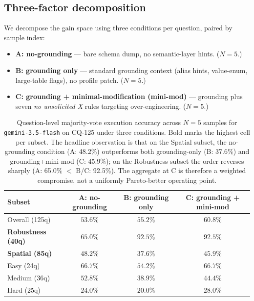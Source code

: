 \subsection{Three-factor decomposition}
\label{sec:gisr:three-factor}

We decompose the gain space using three conditions per question, paired by sample index:
\begin{itemize}[itemsep=2pt]
\item \textbf{A: no-grounding} --- bare schema dump, no semantic-layer hints. ($N{=}5$.)
\item \textbf{B: grounding only} --- standard grounding context (alias hints, value-enum, large-table flags), no profile patch. ($N{=}5$.)
\item \textbf{C: grounding + minimal-modification (mini-mod)} --- grounding plus seven \emph{no unsolicited X} rules targeting over-engineering. ($N{=}5$.)
\end{itemize}

\begin{table}[h]
\centering
\small
\setlength{\tabcolsep}{5pt}
\begin{tabular}{lccc}
\toprule
Subset & A: no-grounding & B: grounding only & C: grounding + mini-mod \\
\midrule
Overall (125q) & $53.6\%$ & $55.2\%$ & $\mathbf{60.8\%}$ \\
\textbf{Robustness (40q)} & $65.0\%$ & $\mathbf{92.5\%}$ & $\mathbf{92.5\%}$ \\
\textbf{Spatial (85q)} & $\mathbf{48.2\%}$ & $37.6\%$ & $45.9\%$ \\
\midrule
Easy (24q) & $\mathbf{66.7\%}$ & $54.2\%$ & $\mathbf{66.7\%}$ \\
Medium (36q) & $\mathbf{52.8\%}$ & $38.9\%$ & $44.4\%$ \\
Hard (25q) & $24.0\%$ & $20.0\%$ & $\mathbf{28.0\%}$ \\
\bottomrule
\end{tabular}
\caption{Question-level majority-vote execution accuracy across $N{=}5$ samples for \texttt{gemini-3.5-flash} on CQ-125 under three conditions. Bold marks the highest cell per subset. The headline observation is that on the Spatial subset, the no-grounding condition (A: 48.2\%) outperforms both grounding-only (B: 37.6\%) and grounding+mini-mod (C: 45.9\%); on the Robustness subset the order reverses sharply (A: 65.0\% $<$ B/C: 92.5\%). The aggregate at C is therefore a weighted compromise, not a uniformly Pareto-better operating point.}
\label{tab:gisr:cells}
\end{table}

